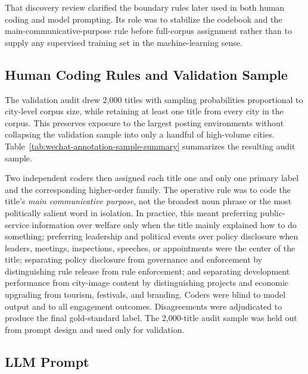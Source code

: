 \documentclass[12pt, american]{article}
\begin{document}


That discovery review clarified the boundary rules later used in both human coding and model prompting. Its role was to stabilize the codebook and the main-communicative-purpose rule before full-corpus assignment rather than to supply any supervised training set in the machine-learning sense.

\subsection{Human Coding Rules and Validation Sample \label{app:wechat-human}}

The validation audit drew 2,000 titles with sampling probabilities proportional to city-level corpus size, while retaining at least one title from every city in the corpus. This preserves exposure to the largest posting environments without collapsing the validation sample into only a handful of high-volume cities. Table~\ref{tab:wechat-annotation-sample-summary} summarizes the resulting audit sample.



Two independent coders then assigned each title one and only one primary label and the corresponding higher-order family. The operative rule was to code the title's \emph{main communicative purpose}, not the broadest noun phrase or the most politically salient word in isolation. In practice, this meant preferring public-service information over welfare only when the title mainly explained how to do something; preferring leadership and political events over policy disclosure when leaders, meetings, inspections, speeches, or appointments were the center of the title; separating policy disclosure from governance and enforcement by distinguishing rule release from rule enforcement; and separating development performance from city-image content by distinguishing projects and economic upgrading from tourism, festivals, and branding. Coders were blind to model output and to all engagement outcomes. Disagreements were adjudicated to produce the final gold-standard label. The 2,000-title audit sample was held out from prompt design and used only for validation.

\subsection{LLM Prompt \label{app:wechat-prompt}}
\end{document}
